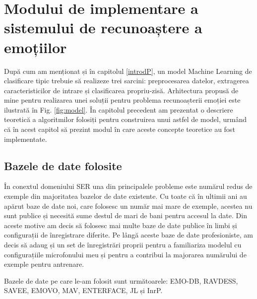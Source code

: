 \documentclass[a4paper,12pt]{book}
\begin{document}
				\section{Modului de implementare a sistemului de recunoaștere a emoțiilor}
				
				După cum am menționat și în capitolul \ref{introdP}, un model Machine Learning de clasificare tipic trebuie să realizeze trei sarcini: preprocesarea datelor, extragerea caracteristicilor de intrare și clasificarea propriu-zisă. Arhitectura propusă de mine pentru realizarea unei soluții pentru problema recunoașterii emoției este ilustrată în Fig. \ref{fig:model}. În capitolul precedent am prezentat o descriere teoretică a algoritmilor folosiți pentru construirea unui astfel de model, urmând că în acest capitol să prezint modul în care aceste concepte teoretice au fost implementate.
				
					\subsection {Bazele de date folosite} \label{datasets}
					În conextul domeniului SER una din principalele probleme este numărul redus de exemple din majoritatea bazelor de date existente. Cu toate că în ultimii ani au apărut baze de date noi, care folosesc un număr mai mare de exemple, acestea nu sunt publice și necesită sume destul de mari de bani pentru accesul la date. Din aceste motive am decis să folosesc mai multe baze de date publice în limbi și configurații de înregistrare diferite. Pe lângă aceste baze de date profesioniste, am decis să adaug și un set de înregistrări proprii pentru a familiariza modelul cu configurațiile microfonului meu și pentru a contribui la majorarea numărului de exemple pentru antrenare.\par
					
					\newpage
					Bazele de date pe care le-am folosit sunt următoarele: EMO-DB, RAVDESS, SAVEE, EMOVO, MAV, ENTERFACE, JL și InrP.
					
\end{document}
